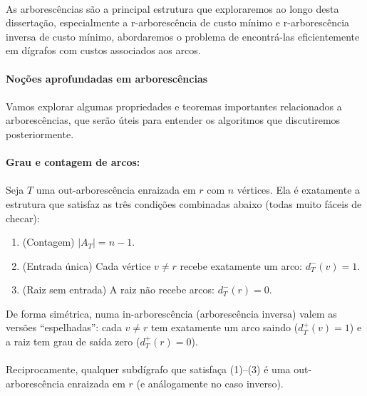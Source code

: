 \documentclass[12pt,a4paper]{article}
\def\emph#1{#1}%
\begin{document}
\paragraph{}
As arborescências são a principal estrutura que exploraremos ao longo desta dissertação, especialmente a r-arborescência de custo mínimo e r-arborescência inversa de custo mínimo, abordaremos o problema de encontrá-las eficientemente em dígrafos com custos associados aos arcos.



\paragraph{Noções aprofundadas em arborescências}

\paragraph{}
Vamos explorar algumas propriedades e teoremas importantes relacionados a arborescências, que serão úteis para entender os algoritmos que discutiremos posteriormente.

\paragraph{Grau e contagem de arcos:}
\paragraph{}
Seja $T$ uma out-arborescência enraizada em $r$ com $n$ vértices. Ela é exatamente a estrutura que satisfaz as três condições combinadas abaixo (todas muito fáceis de checar):
\begin{enumerate}\setlength{\itemsep}{2pt}
    \item (Contagem) $|A_T| = n-1$.
    \item (Entrada única) Cada vértice $v\neq r$ recebe exatamente um arco: $d_T^-(v)=1$.
    \item (Raiz sem entrada) A raiz não recebe arcos: $d_T^-(r)=0$.
\end{enumerate}
De forma simétrica, numa in-arborescência (arborescência inversa) valem as versões “espelhadas”: cada $v\neq r$ tem exatamente um arco \emph{saindo} ($d_T^+(v)=1$) e a raiz tem grau de saída zero ($d_T^+(r)=0$).

\paragraph{}
Reciprocamente, qualquer subdígrafo que satisfaça (1)--(3) é uma out-arborescência enraizada em $r$ (e análogamente no caso inverso).
\end{document}
